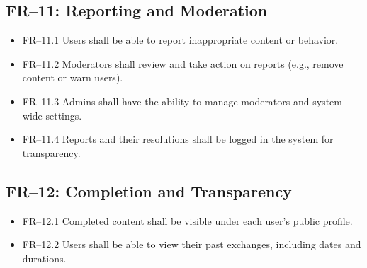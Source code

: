 \documentclass[11pt,a4paper]{report}
\begin{document}
\subsection{FR--11: Reporting and Moderation}
\begin{itemize}
    \item FR--11.1 Users shall be able to report inappropriate content or behavior.
    \item FR--11.2 Moderators shall review and take action on reports (e.g., remove content or warn users).
    \item FR--11.3 Admins shall have the ability to manage moderators and system-wide settings.
    \item FR--11.4 Reports and their resolutions shall be logged in the system for transparency.
\end{itemize}

\subsection{FR--12: Completion and Transparency}
\begin{itemize}
    \item FR--12.1 Completed content shall be visible under each user's public profile.
    \item FR--12.2 Users shall be able to view their past exchanges, including dates and durations.
\end{itemize}
\end{document}
